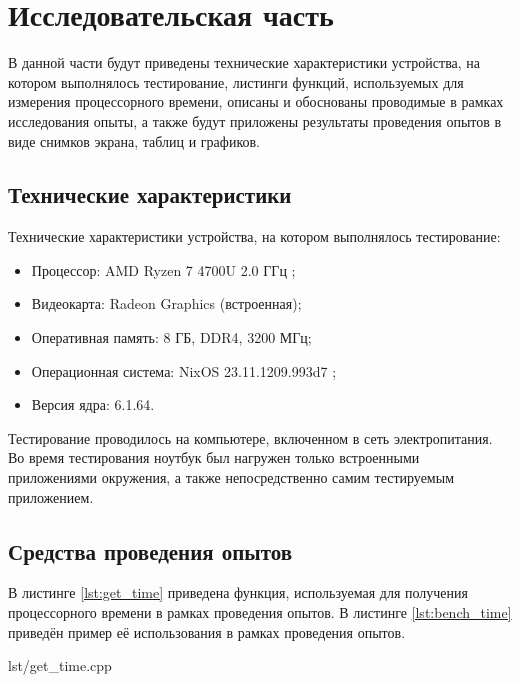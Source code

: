 \section{Исследовательская часть}

В данной части будут приведены технические характеристики устройства, на котором выполнялось тестирование, листинги функций, используемых для измерения процессорного времени, описаны и обоснованы проводимые в рамках исследования опыты, а также будут приложены результаты проведения опытов в виде снимков экрана, таблиц и графиков.

\subsection{Технические характеристики}

Технические характеристики устройства, на котором выполнялось тестирование:
\begin{itemize}
    \item Процессор: AMD Ryzen 7 4700U 2.0 ГГц \cite{amd};
    \item Видеокарта: Radeon Graphics (встроенная);
    \item Оперативная память: 8 ГБ, DDR4, 3200 МГц;
    \item Операционная система: NixOS 23.11.1209.993d7 \cite{nixos};
    \item Версия ядра: 6.1.64.
\end{itemize}

Тестирование проводилось на компьютере, включенном в сеть электропитания.
Во время тестирования ноутбук был нагружен только встроенными приложениями окружения, а также непосредственно самим тестируемым приложением.

\subsection{Средства проведения опытов}

В листинге \ref{lst:get_time} приведена функция, используемая для получения процессорного времени в рамках проведения опытов. В листинге \ref{lst:bench_time} приведён пример её использования в рамках проведения опытов.

\begin{code}
    \begin{lstinputlisting}[
            label={lst:get_time},
            caption={Функция получения процессорного времени},
        ]{lst/get_time.cpp}
    \end{lstinputlisting}
\end{code}

